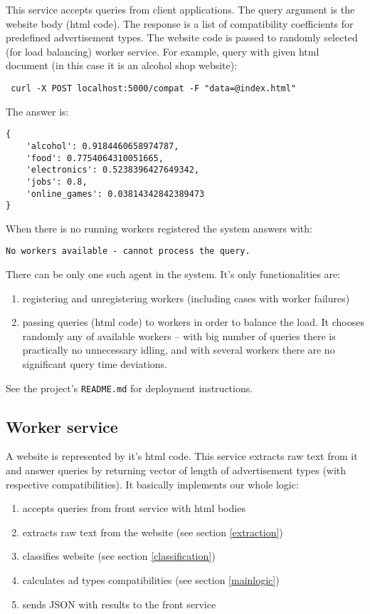 \documentclass[a4paper]{article}
\begin{document}
This service accepts queries from client applications.
The query argument is the website body (html code).
The response is a list of compatibility coefficients for predefined advertisement types.
The website code is passed to randomly selected (for load balancing) worker service.
For example, query with given html document (in this case it is an alcohol shop website):
\begin{verbatim}
 curl -X POST localhost:5000/compat -F "data=@index.html"
\end{verbatim}
The answer is:
\begin{verbatim}
{
    'alcohol': 0.9184460658974787,
    'food': 0.7754064310051665,
    'electronics': 0.5238396427649342,
    'jobs': 0.8,
    'online_games': 0.03814342842389473
}
\end{verbatim}
When there is no running workers registered the system answers with:
\begin{verbatim}
No workers available - cannot process the query.
\end{verbatim}
There can be only one such agent in the system.
It's only functionalities are:
\begin{enumerate}
    \item registering and unregistering workers (including cases with worker failures)
    \item passing queries (html code) to workers in order to balance the load.
        It chooses randomly any of available workers -- with big number of queries
            there is practically no unnecessary idling, and with several
            workers there are no significant query time deviations.
\end{enumerate}
See the project's \texttt{README.md} for deployment instructions.


\subsection{Worker service}
A website is represented by it's html code.
This service extracts raw text from it and answer queries by returning vector of length of advertisement types
(with respective compatibilities).
It basically implements our whole logic:
\begin{enumerate}
    \item accepts queries from front service with html bodies
    \item extracts raw text from the website (see section \ref{extraction})
    \item classifies website (see section \ref{classification})
    \item calculates ad types compatibilities (see section \ref{mainlogic})
    \item sends JSON with results to the front service
\end{enumerate}
\end{document}
